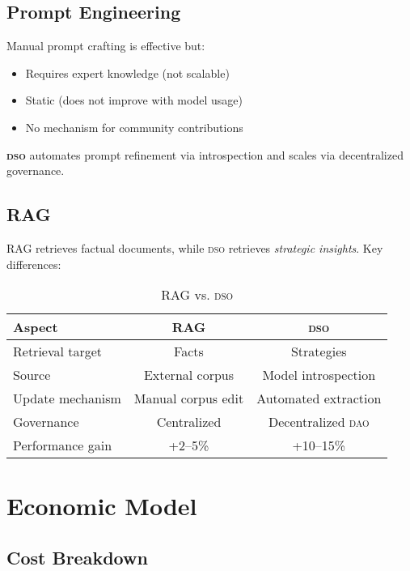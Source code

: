 \documentclass[11pt,letterpaper]{article}
\newcommand{\DSO}{\textsc{dso}}
\newcommand{\DAO}{\textsc{dao}}
\begin{document}
\subsection{Prompt Engineering}

Manual prompt crafting is effective but:

\begin{itemize}
    \item Requires expert knowledge (not scalable)
    \item Static (does not improve with model usage)
    \item No mechanism for community contributions
\end{itemize}

\textbf{\DSO{}} automates prompt refinement via introspection and scales via decentralized governance.

\subsection{RAG}

RAG retrieves factual documents, while \DSO{} retrieves \textit{strategic insights}. Key differences:

\begin{table}[t]
\centering
\caption{RAG vs. \DSO{}}
\label{tab:rag-vs-dso}
\begin{tabular}{lcc}
\toprule
\textbf{Aspect} & \textbf{RAG} & \textbf{\DSO{}} \\
\midrule
Retrieval target & Facts & Strategies \\
Source & External corpus & Model introspection \\
Update mechanism & Manual corpus edit & Automated extraction \\
Governance & Centralized & Decentralized \DAO{} \\
Performance gain & +2--5\% & +10--15\% \\
\bottomrule
\end{tabular}
\end{table}

\section{Economic Model}

\subsection{Cost Breakdown}
\end{document}
